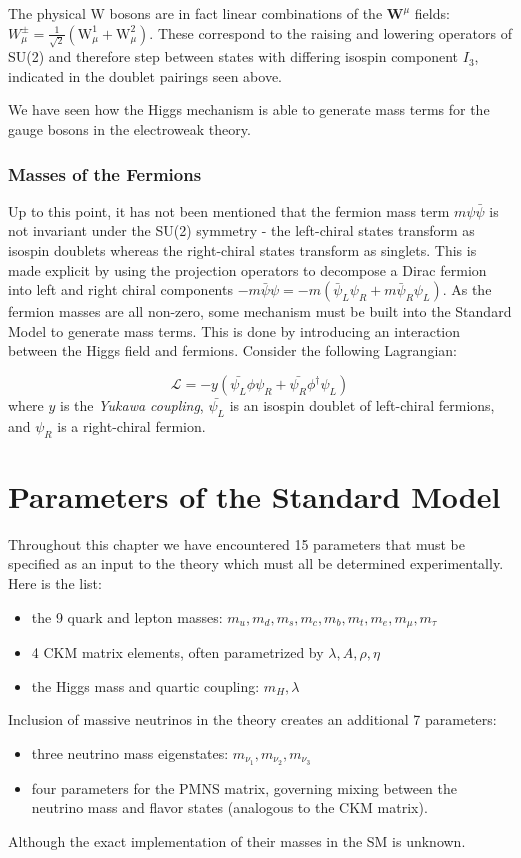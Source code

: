 The physical W bosons are in fact linear combinations of the $\mathrm{\bm{W}}^{\mu}$ fields: $W^{\pm}_{\mu}= \frac{1}{\sqrt{2}}(\mathrm{W}^{1}_{\mu} + \mathrm{W}^{2}_{\mu})$. These correspond to the raising and lowering operators of SU(2) and therefore step between states with differing isospin component $I_{3}$, indicated in the doublet pairings seen above.

We have seen how the Higgs mechanism is able to generate mass terms for the gauge bosons in the electroweak theory.

\subsubsection{Masses of the Fermions}

Up to this point, it has not been mentioned that the fermion mass term $m\psi\bar{\psi}$ is not invariant under the SU(2) symmetry - the left-chiral states transform as isospin doublets whereas the right-chiral states transform as singlets. This is made explicit by using the projection operators to decompose a Dirac fermion into left and right chiral components $-m\bar{\psi}\psi = -m(\bar{\psi}_{L}\psi_{R} + m\bar{\psi}_{R}\psi_{L})$. As the fermion masses are all non-zero, some mechanism must be built into the Standard Model to generate mass terms. This is done by introducing an interaction between the Higgs field and fermions. Consider the following Lagrangian:

\begin{equation}
\mathcal{L} = -y ( \bar{\psi_{L}} \phi \psi_{R} + \bar{\psi_{R}} \phi^{\dagger} \psi_{L})
\end{equation}
where $y$ is the \textit{Yukawa coupling}, $\bar{\psi_{L}}$ is an isospin doublet of left-chiral fermions, and $\psi_{R}$ is a right-chiral fermion.

\section{Parameters of the Standard Model}

Throughout this chapter we have encountered 15 parameters that must be specified as an input to the theory which must all be determined experimentally. Here is the list:
\begin{itemize}
\item the 9 quark and lepton masses: $m_{u}, m_{d}, m_{s}, m_{c}, m_{b}, m_{t}, m_{e}, m_{\mu}, m_{\tau}$
\item 4 CKM matrix elements, often parametrized by $\lambda, A, \rho, \eta$
\item the Higgs mass and quartic coupling: $m_{H}, \lambda$
\end{itemize}

Inclusion of massive neutrinos in the theory creates an additional 7 parameters:
\begin{itemize}
\item three neutrino mass eigenstates: $m_{\nu_{1}}, m_{\nu_{2}}, m_{\nu_{3}}$
\item four parameters for the PMNS matrix, governing mixing between the neutrino mass and flavor states (analogous to the CKM matrix).
\end{itemize}
Although the exact implementation of their masses in the SM is unknown.

